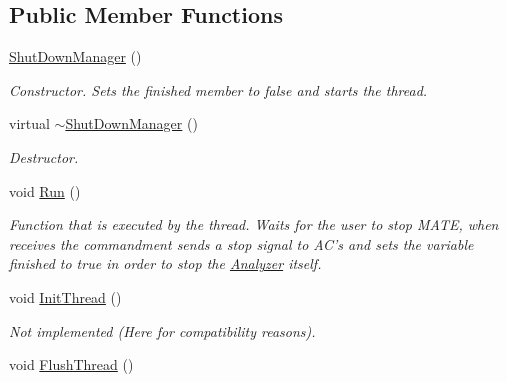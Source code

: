 \subsection*{Public Member Functions}
\begin{DoxyCompactItemize}
\item 
\hypertarget{class_shut_down_manager_a373a3e5c8f679f267bb28137fe07ce30}{\hyperlink{class_shut_down_manager_a373a3e5c8f679f267bb28137fe07ce30}{Shut\-Down\-Manager} ()}\label{class_shut_down_manager_a373a3e5c8f679f267bb28137fe07ce30}

\begin{DoxyCompactList}\small\item\em Constructor. Sets the finished member to false and starts the thread. \end{DoxyCompactList}\item 
\hypertarget{class_shut_down_manager_a2e0806790f911ea1a55a57a0d500688c}{virtual \hyperlink{class_shut_down_manager_a2e0806790f911ea1a55a57a0d500688c}{$\sim$\-Shut\-Down\-Manager} ()}\label{class_shut_down_manager_a2e0806790f911ea1a55a57a0d500688c}

\begin{DoxyCompactList}\small\item\em Destructor. \end{DoxyCompactList}\item 
\hypertarget{class_shut_down_manager_ac62ac5b8a6874ebfedd803441e9632f1}{void \hyperlink{class_shut_down_manager_ac62ac5b8a6874ebfedd803441e9632f1}{Run} ()}\label{class_shut_down_manager_ac62ac5b8a6874ebfedd803441e9632f1}

\begin{DoxyCompactList}\small\item\em Function that is executed by the thread. Waits for the user to stop M\-A\-T\-E, when receives the commandment sends a stop signal to A\-C's and sets the variable finished to true in order to stop the \hyperlink{class_analyzer}{Analyzer} itself. \end{DoxyCompactList}\item 
\hypertarget{class_shut_down_manager_a462837aa4f84a45d7a1a674bdd2d691f}{void \hyperlink{class_shut_down_manager_a462837aa4f84a45d7a1a674bdd2d691f}{Init\-Thread} ()}\label{class_shut_down_manager_a462837aa4f84a45d7a1a674bdd2d691f}

\begin{DoxyCompactList}\small\item\em Not implemented (Here for compatibility reasons). \end{DoxyCompactList}\item 
\hypertarget{class_shut_down_manager_a03feeacd729d3c55a2367c0859c1474b}{void \hyperlink{class_shut_down_manager_a03feeacd729d3c55a2367c0859c1474b}{Flush\-Thread} ()}\label{class_shut_down_manager_a03feeacd729d3c55a2367c0859c1474b}


\end{DoxyCompactItemize}
